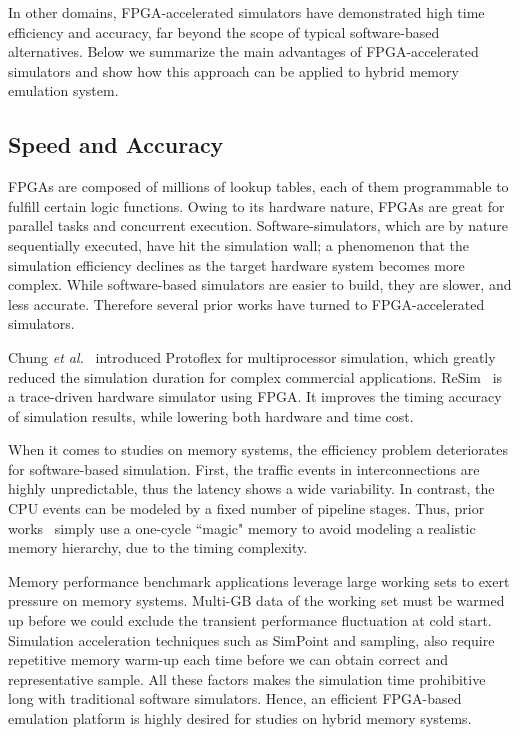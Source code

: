 \documentclass[conference]{IEEEtran}
\begin{document}
In other domains, FPGA-accelerated simulators have demonstrated high
time efficiency and accuracy, far beyond the scope of typical
software-based alternatives.  Below we summarize the main advantages
of FPGA-accelerated simulators and show how this approach can be
applied to hybrid memory emulation system.


\subsection{Speed and Accuracy} 
FPGAs are composed of millions of lookup tables, each of them
programmable to fulfill certain logic functions.  Owing to its
hardware nature, FPGAs are great for parallel tasks and concurrent
execution.  Software-simulators, which are by nature sequentially
executed, have hit the simulation wall; a phenomenon that the
simulation efficiency declines as the target hardware system becomes
more complex. While software-based simulators are easier to build,
they are slower, and less accurate. Therefore several prior works have
turned to FPGA-accelerated simulators.

Chung \emph{et al.}~\cite{Chung:PROTOFLEX} introduced Protoflex for
multiprocessor simulation, which greatly reduced the simulation
duration for complex commercial applications.
ReSim~\cite{Fytraki:ReSim} is a trace-driven hardware simulator using
FPGA. It improves the timing accuracy of simulation results, while
lowering both hardware and time cost.\par
When it comes to studies on memory systems, the efficiency problem deteriorates for software-based simulation. First, the
traffic events in interconnections are highly unpredictable, thus the
latency shows a wide variability. In contrast, the CPU events can be
modeled by a fixed number of pipeline stages. Thus, prior
works~\cite{Aport} simply use a one-cycle ``magic" memory to avoid
modeling a realistic memory hierarchy, due to the timing complexity.
\par
Memory performance benchmark applications leverage large working sets to exert pressure on memory systems. Multi-GB data of the working set must be warmed up before we could exclude the transient performance fluctuation at cold start. Simulation acceleration techniques such as SimPoint and sampling, also require repetitive memory warm-up each time before we can obtain correct and representative sample. All these factors makes the simulation time prohibitive long with traditional software simulators. 
Hence, an efficient FPGA-based emulation platform is highly desired
for studies on hybrid memory systems.
\end{document}
